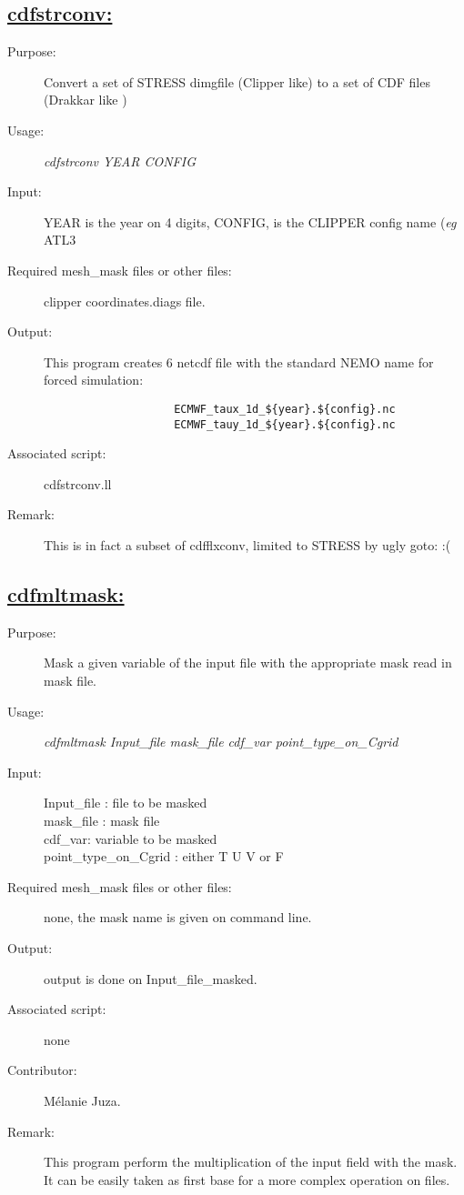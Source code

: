 \documentclass[a4paper,11pt]{article}
\begin{document}
\subsection*{\underline{cdfstrconv:}}
\begin{description}
\item[Purpose:]  Convert a set of STRESS dimgfile (Clipper like)
                 to a set of CDF files (Drakkar like )
\item[Usage:] {\em cdfstrconv  YEAR CONFIG }
\item[Input:]  YEAR is the year on 4 digits, CONFIG, is the CLIPPER config name ({\it eg} ATL3
\item[Required mesh\_mask files or other files:] clipper coordinates.diags file.
\item[Output:] This program creates 6 netcdf file with the standard NEMO name for forced simulation:\\
\begin{verbatim}
                    ECMWF_taux_1d_${year}.${config}.nc
                    ECMWF_tauy_1d_${year}.${config}.nc
\end{verbatim}
\item[Associated script:] cdfstrconv.ll
\item[Remark:] This is in fact a subset of cdfflxconv, limited to STRESS by ugly goto: :(
\end{description}





\newpage
\subsection*{\underline{cdfmltmask:}}
\begin{description}
\item[Purpose:]  Mask a given variable of the input file with the appropriate mask read in mask file.
\item[Usage:] {\em cdfmltmask Input\_file mask\_file cdf\_var point\_type\_on\_Cgrid}
\item[Input:] Input\_file : file to be masked \\
           mask\_file : mask file \\
           cdf\_var: variable to be masked \\
           point\_type\_on\_Cgrid : either T U V or F
\item[Required mesh\_mask files or other files:] none, the mask name is given on command line.
\item[Output:] output is done on Input\_file\_masked.
\item[Associated script:] none
\item[Contributor:] M\'elanie Juza.
\item[Remark:] This program perform the multiplication of the input field with the mask. It can be easily taken as
      first base for a more complex operation on files.
\end{description}
\end{document}
